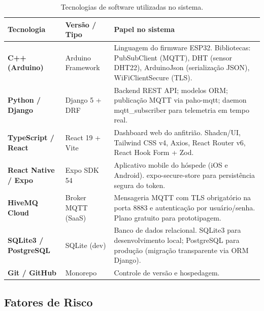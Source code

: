 \documentclass[12pt,a4paper]{article}
\begin{document}
\begin{table}[H]
  \centering
  \caption{Tecnologias de software utilizadas no sistema.}
  \label{tab:software}
  \begin{tabular}{p{3cm} p{2.8cm} p{8.2cm}}
    \toprule
    \textbf{Tecnologia} & \textbf{Versão / Tipo} & \textbf{Papel no sistema} \\
    \midrule
    \textbf{C++ (Arduino)} & Arduino Framework &
      Linguagem do firmware ESP32. Bibliotecas: PubSubClient (MQTT),
      DHT (sensor DHT22), ArduinoJson (serialização JSON), WiFiClientSecure (TLS). \\[4pt]

    \textbf{Python / Django} & Django 5 + DRF &
      Backend REST API; modelos ORM; publicação MQTT via paho-mqtt;
      daemon mqtt\_subscriber para telemetria em tempo real. \\[4pt]

    \textbf{TypeScript / React} & React 19 + Vite &
      Dashboard web do anfitrião. Shadcn/UI, Tailwind CSS v4, Axios, React Router v6,
      React Hook Form + Zod. \\[4pt]

    \textbf{React Native / Expo} & Expo SDK 54 &
      Aplicativo mobile do hóspede (iOS e Android). expo-secure-store para
      persistência segura do token. \\[4pt]

    \textbf{HiveMQ Cloud} & Broker MQTT (SaaS) &
      Mensageria MQTT com TLS obrigatório na porta 8883 e autenticação
      por usuário/senha. Plano gratuito para prototipagem. \\[4pt]

    \textbf{SQLite3 / PostgreSQL} & SQLite (dev) &
      Banco de dados relacional. SQLite3 para desenvolvimento local;
      PostgreSQL para produção (migração transparente via ORM Django). \\[4pt]

    \textbf{Git / GitHub} & Monorepo &
      Controle de versão e hospedagem.
  \end{tabular}
  \par{}
\end{table}

\subsection{Fatores de Risco}
\end{document}
